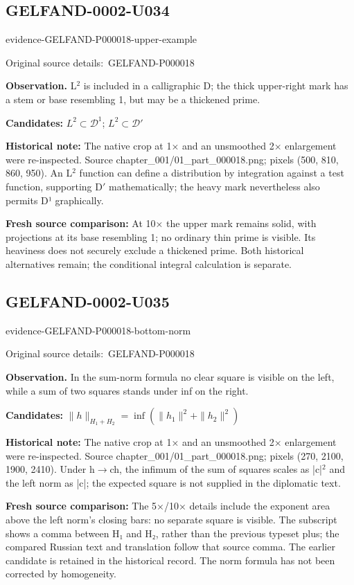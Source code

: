 \documentclass[11pt]{article}
\newcommand{\EvidenceBlock}[4]{%
 \par\smallskip\noindent\begin{minipage}{\linewidth}
 \begin{minipage}[t]{.47\linewidth}\vspace{0pt}\centering
 \csname evidence-#1-#2\endcsname\par
 {\scriptsize\SourceCropCaption\ #1}\par
 \end{minipage}\hfill
 \begin{minipage}[t]{.49\linewidth}\vspace{0pt}\raggedright
 {\small\color{orange!65!black}\textbf{#4} #3}\par
 \end{minipage}
 \end{minipage}\par\smallskip}
\newcommand{\SourceCropCaption}{Original source details:}\newcommand{\ReadingCaption}{Uncertain reading.}\newcommand{\IncompleteCaption}{Undeciphered passage.}\newcommand{\DiagramCaption}{Diagram and typed description.}
\begin{document}
\subsection*{GELFAND-0002-U034}
\EvidenceBlock{GELFAND-P000018}{upper-example}{L\(^2\) is included in a calligraphic D; the thick upper-right mark has a stem or base resembling 1, but may be a thickened prime.}{Observation.}
\par\smallskip\noindent\textbf{Candidates: } \(L^2\subset\mathcal D^1\); \(L^2\subset\mathcal D'\)\par
\par\smallskip\noindent\textbf{Historical note: } The native crop at 1× and an unsmoothed 2× enlargement were re-inspected. Source chapter\_001/01\_part\_000018.png; pixels (500, 810, 860, 950). An L\(^2\) function can define a distribution by integration against a test function, supporting D\(\prime\) mathematically; the heavy mark nevertheless also permits D¹ graphically.\par
\par\smallskip\noindent\textbf{Fresh source comparison: } At 10× the upper mark remains solid, with projections at its base resembling 1; no ordinary thin prime is visible. Its heaviness does not securely exclude a thickened prime. Both historical alternatives remain; the conditional integral calculation is separate.\par

\subsection*{GELFAND-0002-U035}
\EvidenceBlock{GELFAND-P000018}{bottom-norm}{In the sum-norm formula no clear square is visible on the left, while a sum of two squares stands under inf on the right.}{Observation.}
\par\smallskip\noindent\textbf{Candidates: } \(\|h\|_{H_1+H_2}=\inf(\|h_1\|^2+\|h_2\|^2)\)\par
\par\smallskip\noindent\textbf{Historical note: } The native crop at 1× and an unsmoothed 2× enlargement were re-inspected. Source chapter\_001/01\_part\_000018.png; pixels (270, 2100, 1900, 2410). Under h\(\to\)ch, the infimum of the sum of squares scales as |c|\(^2\) and the left norm as |c|; the expected square is not supplied in the diplomatic text.\par
\par\smallskip\noindent\textbf{Fresh source comparison: } The 5×/10× details include the exponent area above the left norm’s closing bars: no separate square is visible. The subscript shows a comma between H₁ and H₂, rather than the previous typeset plus; the compared Russian text and translation follow that source comma. The earlier candidate is retained in the historical record. The norm formula has not been corrected by homogeneity.\par
\end{document}
